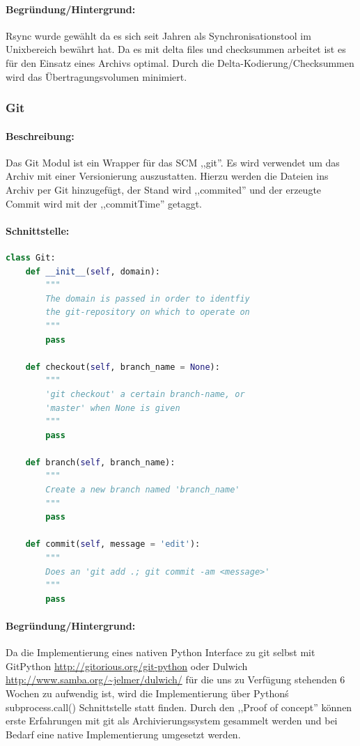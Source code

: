 \paragraph{Begründung/Hintergrund:}
\label{par:begr_ndung_hintergrund_}
Rsync wurde gewählt da es sich seit Jahren als Synchronisationstool im Unixbereich bewährt hat.
Da es mit delta files und checksummen arbeitet ist es für den Einsatz eines Archivs optimal.
Durch die Delta-Kodierung/Checksummen wird das Übertragungsvolumen minimiert.


\subsubsection{Git}
\label{ssub:git}
\paragraph{Beschreibung:}
\label{par:beschreibung_}
Das Git Modul ist ein Wrapper für das SCM ,,git''. Es wird verwendet um das Archiv mit einer Versionierung auszustatten. Hierzu werden 
die Dateien ins Archiv per Git hinzugefügt, der Stand wird ,,commited''
und der erzeugte Commit wird mit der ,,commitTime'' getaggt.

\paragraph{Schnittstelle:}
\label{par:schnittstelle_}
\begin{lstlisting}[language=python]
class Git:
    def __init__(self, domain):
        """
        The domain is passed in order to identfiy
        the git-repository on which to operate on
        """
        pass

    def checkout(self, branch_name = None):
        """
        'git checkout' a certain branch-name, or 
        'master' when None is given
        """
        pass

    def branch(self, branch_name):
        """
        Create a new branch named 'branch_name'
        """
        pass

    def commit(self, message = 'edit'):
        """
        Does an 'git add .; git commit -am <message>'
        """
        pass
\end{lstlisting}

\paragraph{Begründung/Hintergrund:}
\label{par:begr_ndung_hintergrund_}
Da die Implementierung eines nativen Python Interface zu git selbst mit GitPython
\url{http://gitorious.org/git-python} oder Dulwich \url{http://www.samba.org/~jelmer/dulwich/}
für die uns zu Verfügung stehenden 6 Wochen zu aufwendig ist, wird die Implementierung über
Python\'s subprocess.call() Schnittstelle statt finden. Durch den ,,Proof of concept'' können
erste Erfahrungen mit git als Archivierungssystem gesammelt werden und bei Bedarf eine native Implementierung
umgesetzt werden.



